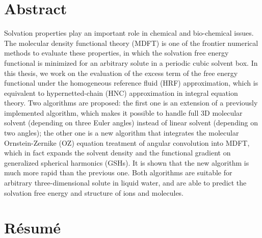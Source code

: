 \begingroup
\let\clearpage\relax
\let\cleardoublepage\relax


\chapter*{Abstract}

Solvation properties play an important role in chemical and bio-chemical
issues. The molecular density functional theory (\acs{MDFT}) is one
of the frontier numerical methods to evaluate these properties, in
which the solvation free energy functional is minimized for an arbitrary
solute in a periodic cubic solvent box. In this thesis, we work on
the evaluation of the excess term of the free energy functional under
the homogeneous reference fluid (\acs{HRF}) approximation, which
is equivalent to hypernetted-chain (\acs{HNC}) approximation in integral
equation theory. Two algorithms are proposed: the first one is an
extension of a previously implemented algorithm, which makes it possible
to handle full 3D molecular solvent (depending on three Euler angles)
instead of linear solvent (depending on two angles); the other one
is a new algorithm that integrates the molecular Ornstein-Zernike
(\acs{OZ}) equation treatment of angular convolution into \acs{MDFT},
which in fact expands the solvent density and the functional gradient
on generalized spherical harmonics (\acs{GSH}s). It is shown that
the new algorithm is much more rapid than the previous one. Both algorithms
are suitable for arbitrary three-dimensional solute in liquid water,
and are able to predict the solvation free energy and structure of
ions and molecules.

\vfill{}


\chapter*{Résumé}


